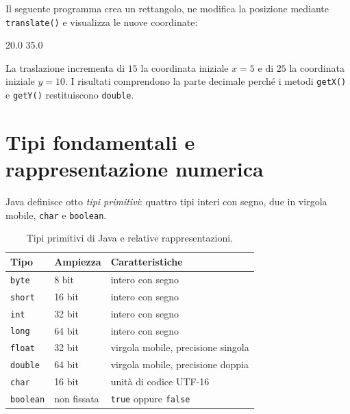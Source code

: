\begin{example}
Il seguente programma crea un rettangolo, ne modifica
la posizione mediante \texttt{translate()} e visualizza
le nuove coordinate:



\begin{unipdterminal}
20.0
35.0
\end{unipdterminal}

La traslazione incrementa di \(15\) la coordinata iniziale
\(x=5\) e di \(25\) la coordinata iniziale \(y=10\).
I risultati comprendono la parte decimale perché i metodi
\texttt{getX()} e \texttt{getY()} restituiscono \texttt{double}.
\end{example}

\clearpage

\section{Tipi fondamentali e rappresentazione numerica}
\label{sec:fi-java-tipi-fondamentali}

Java definisce otto \emph{tipi primitivi}: quattro tipi interi
con segno, due in virgola mobile, \texttt{char} e
\texttt{boolean}.

\begin{table}[htbp]
  \centering
  \begin{tabular}{lll}
    \toprule
    Tipo & Ampiezza & Caratteristiche \\
    \midrule
    \texttt{byte} & 8 bit & intero con segno \\
    \texttt{short} & 16 bit & intero con segno \\
    \texttt{int} & 32 bit & intero con segno \\
    \texttt{long} & 64 bit & intero con segno \\
    \texttt{float} & 32 bit & virgola mobile, precisione singola \\
    \texttt{double} & 64 bit & virgola mobile, precisione doppia \\
    \texttt{char} & 16 bit & unità di codice UTF-16 \\
    \texttt{boolean} & non fissata & \texttt{true} oppure \texttt{false} \\
    \bottomrule
  \end{tabular}
  \caption{Tipi primitivi di Java e relative rappresentazioni.}
  \label{tab:fi-java-tipi-primitivi}
\end{table}

